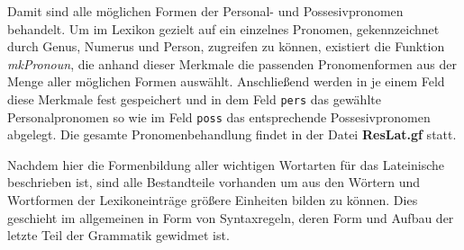 Damit sind alle möglichen Formen der Personal- und Possesivpronomen behandelt. Um im Lexikon gezielt auf ein einzelnes Pronomen, gekennzeichnet durch Genus, Numerus und Person, zugreifen zu können, existiert die Funktion \textit{mkPronoun}, die anhand dieser Merkmale die passenden Pronomenformen aus der Menge aller möglichen Formen auswählt. Anschließend werden in je einem Feld diese Merkmale fest gespeichert und in dem Feld \texttt{pers} das gewählte Personalpronomen so wie im Feld \texttt{poss} das entsprechende Possesivpronomen abgelegt. Die gesamte Pronomenbehandlung findet in der Datei \textbf{ResLat.gf} statt. \par
Nachdem hier die Formenbildung aller wichtigen Wortarten für das Lateinische beschrieben ist, sind alle Bestandteile vorhanden um aus den Wörtern und Wortformen der Lexikoneinträge größere Einheiten bilden zu können. Dies geschieht im allgemeinen in Form von Syntaxregeln, deren Form und Aufbau der letzte Teil der Grammatik gewidmet ist.